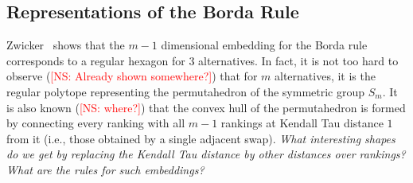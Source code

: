 \documentclass[10pt,letterpaper]{article}
\newcommand{\kibitz}[2]{\ifnum\Comments=1\textcolor{#1}{#2}\fi}
\newcommand{\cns}[1]{\kibitz{red} {[NS: #1]}}
\begin{document}
\subsection{Representations of the Borda Rule}
Zwicker~\cite{Zwicker08a} shows that the $m-1$ dimensional embedding for the Borda rule corresponds to a regular hexagon for $3$ alternatives. In fact, it is not too hard to observe (\cns{Already shown somewhere?}) that for $m$ alternatives, it is the regular polytope representing the permutahedron of the symmetric group $S_m$. It is also known (\cns{where?}) that the convex hull of the permutahedron is formed by connecting every ranking with all $m-1$ rankings at Kendall Tau distance $1$ from it (i.e., those obtained by a single adjacent swap). \emph{What interesting shapes do we get by replacing the Kendall Tau distance by other distances over rankings? What are the rules for such embeddings?}

\end{document}
